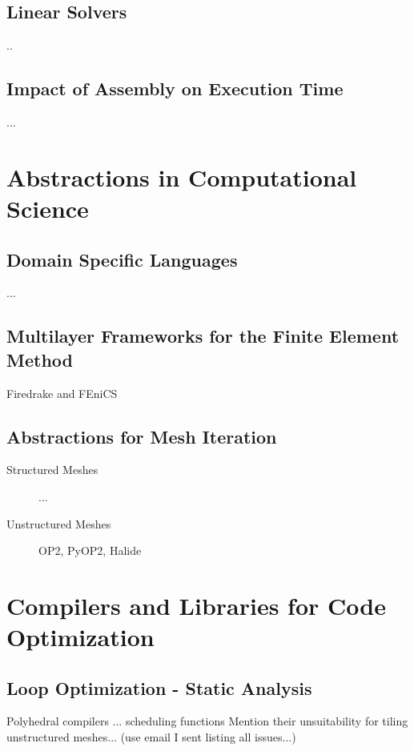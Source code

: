 \subsection{Linear Solvers}
\label{sec:bkg:linearsolvers}
..

\subsection{Impact of Assembly on Execution Time}
\label{sec:bkg:impact}
...


\section{Abstractions in Computational Science}
\label{sec:bkg:abstractions}

\subsection{Domain Specific Languages}
...

\subsection{Multilayer Frameworks for the Finite Element Method}
Firedrake and FEniCS

\subsection{Abstractions for Mesh Iteration}
\begin{description}
\item[Structured Meshes] ...
\item[Unstructured Meshes] OP2, PyOP2, Halide
\end{description}

\section{Compilers and Libraries for Code Optimization}
\label{sec:bkg:codeopt}


\subsection{Loop Optimization - Static Analysis}
\label{sec:bkg:poly}
Polyhedral compilers ...
scheduling functions
Mention their unsuitability for tiling unstructured meshes... (use email I sent listing all issues...)




